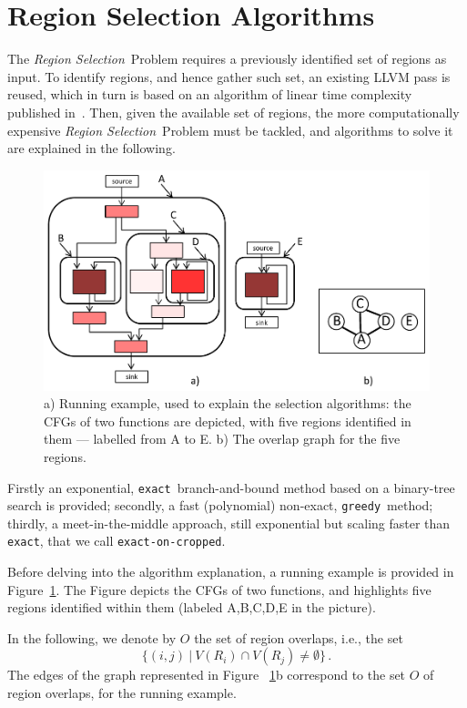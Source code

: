 \documentclass[]{usiinfthesis}
\newcommand{\exact}{\texttt{exact}}
\newcommand{\greedy}{\texttt{greedy}}
\newcommand{\exactC}{\texttt{exact-on-cropped}}
\newcommand{\rsprobname}{\emph{Region Selection}}
\begin{document}
%
%
%
%
%
%
%

\section{Region Selection Algorithms}
\label{sec:rs_algos}


The \rsprobname\ Problem requires a previously identified set of regions
as input. To identify regions, and hence gather such set, an existing LLVM 
pass is reused, which in turn is based on an algorithm of linear
time complexity published in~\cite{JohnsonJun94}. Then, given the
available set of regions, the more computationally expensive
\rsprobname\ Problem must be tackled, and algorithms to solve it are
explained in the following.\par

\begin{figure}
\centering
\includegraphics[width= .7 \linewidth]{figs/exact_example.pdf}
\caption{a) Running example, used to explain the selection algorithms:
  the CFGs of two functions are depicted, with five regions identified
  in them --- labelled from A to E. b) The overlap graph for the five
  regions.}
\label{fig:exact_example}
\end{figure}

Firstly an exponential, \exact\ branch-and-bound method
based on a binary-tree search is provided; secondly, a fast (polynomial)
non-exact, \greedy\ method; thirdly, a meet-in-the-middle approach,
still exponential but scaling faster than \exact, that we call
\exactC.\par

Before delving into the algorithm explanation, a running example
is provided in Figure~\ref{fig:exact_example}. The
Figure depicts the CFGs of two functions, and highlights five regions
identified within them (labeled A,B,C,D,E in the picture).\par
In the following, we denote by $O$ the set of region overlaps, i.e.,
the set
$$
\{ (i, j)\ |\ V(R_i)\cap V(R_j) \neq \emptyset \}\,.
$$
The edges of the graph represented in Figure ~\ref{fig:exact_example}b
correspond to the set $O$ of region overlaps, for the running example.
\end{document}
